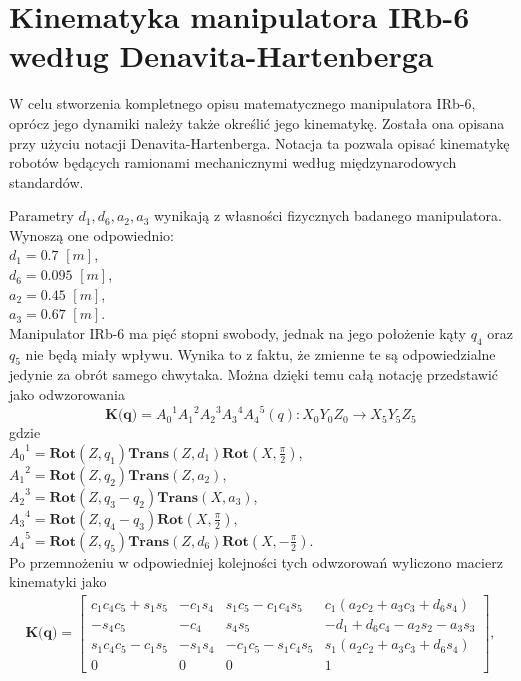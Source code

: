 \documentclass[eng,printmode]{mgr}
\begin{document}
\section{Kinematyka manipulatora IRb-6 według Denavita-Hartenberga}
W celu stworzenia kompletnego opisu matematycznego manipulatora IRb-6, oprócz jego dynamiki należy także określić jego kinematykę. Została ona opisana przy użyciu notacji Denavita-Hartenberga. Notacja ta pozwala opisać kinematykę robotów będących ramionami mechanicznymi według międzynarodowych standardów. 


Parametry $d_1, d_6, a_2, a_3$ wynikają z własności fizycznych badanego manipulatora. Wynoszą one odpowiednio:\\
$d_1 = 0.7$ $[m]$,\\
$d_6 = 0.095$ $[m]$,\\
$a_2 = 0.45$ $[m]$,\\
$a_3 = 0.67$ $[m]$.\\


Manipulator IRb-6 ma pięć stopni swobody, jednak na jego położenie kąty $q_4$ oraz $q_5$ nie będą miały wpływu. Wynika to z faktu, że zmienne te są odpowiedzialne jedynie za obrót samego chwytaka. Można dzięki temu całą notację przedstawić jako odwzorowania
\begin{equation}
\textbf{K(q)}= {A_0}^1{A_1}^2{A_2}^3{A_3}^4{A_4}^5(q):X_0Y_0Z_0 \to X_5Y_5Z_5
\end{equation}
gdzie\\
${A_0}^1=\textbf{Rot}(Z, q_1)\textbf{Trans}(Z, d_1)\textbf{Rot}(X,\frac{\pi}{2})$,\\
${A_1}^2=\textbf{Rot}(Z, q_2)\textbf{Trans}(Z, a_2)$,\\
${A_2}^3=\textbf{Rot}(Z, q_3-q_2)\textbf{Trans}(X, a_3)$,\\
${A_3}^4=\textbf{Rot}(Z, q_4-q_3)\textbf{Rot}(X, \frac{\pi}{2})$,\\
${A_4}^5=\textbf{Rot}(Z, q_5)\textbf{Trans}(Z, d_6)\textbf{Rot}(X, -\frac{\pi}{2})$.\\
Po przemnożeniu w odpowiedniej kolejności tych odwzorowań wyliczono macierz kinematyki jako
\begin{eqnarray}
\textbf{K(q)}= \left[
        \begin{array}{cccc}
         c_1c_4c_5+s_1s_5 & -c_1s_4 &s_1c_5 -c_1c_4s_5 & c_1(a_2c_2+a_3c_3+d_6s_4)\\ 
       -s_4c_5& -c_4& s_4s_5& -d_1+d_6c_4-a_2s_2-a_3s_3\\
         s_1c_4c_5-c_1s_5& -s_1s_4& -c_1c_5-s_1c_4s_5& s_1(a_2c_2+a_3c_3+d_6s_4)\\
         0&0&0&1
         \end{array}
      \right],
\end{eqnarray} 
     
\end{document}
